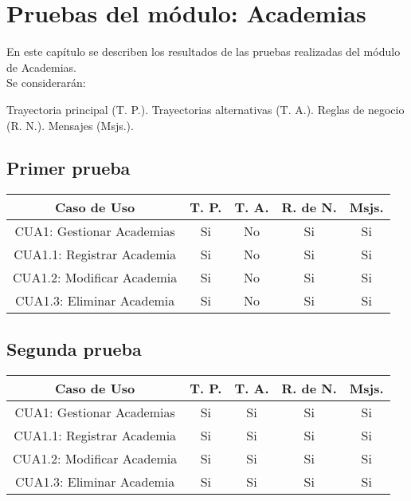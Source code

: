 \newpage

\section{Pruebas del módulo: Academias} \label{chp:pruebasAcademias}
	En este capítulo se describen los resultados de las pruebas realizadas del módulo de Academias. \\

	Se considerarán: \\
	\begin{Titemize}
		\Titem Trayectoria principal (T. P.).
		\Titem Trayectorias alternativas (T. A.).
		\Titem Reglas de negocio (R. N.).
		\Titem Mensajes (Msjs.).
	\end{Titemize}


\subsection{Primer prueba}
\begin{center}
	\begin{tabular}{ |c|c|c|c|c| } 
		\hline
		Caso de Uso & T. P. & T. A. & R. de N. & Msjs. \\
		\hline 
		CUA1: Gestionar Academias & Si & No & Si & Si \\ 
		CUA1.1: Registrar Academia & Si & No & Si & Si \\ 
		CUA1.2: Modificar Academia & Si & No & Si & Si \\ 
		CUA1.3: Eliminar Academia & Si & No & Si & Si \\ 
		\hline
	\end{tabular}
\end{center}

\subsection{Segunda prueba}
\begin{center}
	\begin{tabular}{ |c|c|c|c|c| } 
		\hline
		Caso de Uso & T. P. & T. A. & R. de N. & Msjs. \\
		\hline 
		CUA1: Gestionar Academias & Si & Si & Si & Si \\ 
		CUA1.1: Registrar Academia & Si & Si & Si & Si \\ 
		CUA1.2: Modificar Academia & Si & Si & Si & Si \\ 
		CUA1.3: Eliminar Academia & Si & Si & Si & Si \\ 
		\hline
	\end{tabular}
\end{center}

